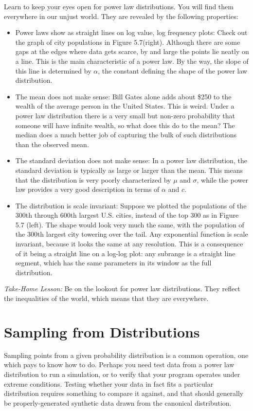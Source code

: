 \documentclass[10pt]{article}
\begin{document}
Learn to keep your eyes open for power law distributions. You will find them everywhere in our unjust world. They are revealed by the following properties:
\begin{itemize}
  \item Power laws show as straight lines on log value, log frequency plots: Check out the graph of city populations in Figure 5.7(right). Although there are some gaps at the edges where data gets scarce, by and large the points lie neatly on a line. This is the main characteristic of a power law. By the way, the slope of this line is determined by $\alpha$, the constant defining the shape of the power law distribution.
  \item The mean does not make sense: Bill Gates alone adds about \$250 to the wealth of the average person in the United States. This is weird. Under a power law distribution there is a very small but non-zero probability that someone will have infinite wealth, so what does this do to the mean? The median does a much better job of capturing the bulk of such distributions than the observed mean.
  \item The standard deviation does not make sense: In a power law distribution, the standard deviation is typically as large or larger than the mean. This means that the distribution is very poorly characterized by $\mu$ and $\sigma$, while the power law provides a very good description in terms of $\alpha$ and $c$.
  \item The distribution is scale invariant: Suppose we plotted the populations of the 300th through 600th largest U.S. cities, instead of the top 300 as in Figure 5.7 (left). The shape would look very much the same, with the population of the 300th largest city towering over the tail. Any exponential function is scale invariant, because it looks the same at any resolution. This is a consequence of it being a straight line on a log-log plot: any subrange is a straight line segment, which has the same parameters in its window as the full distribution.
\end{itemize}

\textit{Take-Home Lesson:} Be on the lookout for power law distributions. They reflect the inequalities of the world, which means that they are everywhere.

\section{Sampling from Distributions}
Sampling points from a given probability distribution is a common operation, one which pays to know how to do. Perhaps you need test data from a power law distribution to run a simulation, or to verify that your program operates under extreme conditions. Testing whether your data in fact fits a particular distribution requires something to compare it against, and that should generally be properly-generated synthetic data drawn from the canonical distribution.
\end{document}
